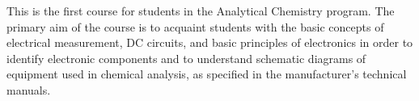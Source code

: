 {This is the first course for students in the Analytical Chemistry program. The primary aim of the course is to acquaint students with the basic concepts of electrical measurement, DC circuits, and basic principles of electronics in order to identify electronic components and to understand schematic diagrams of equipment used in chemical analysis, as specified in the manufacturer's technical manuals.}
